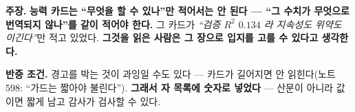 \documentclass[10pt,a4paper]{article}
\newcommand{\claim}[2]{\begin{claimbox}\textbf{주장.} #1\par\smallskip
  \textcolor{gray!70}{\textbf{반증 조건.} #2}\end{claimbox}}
\begin{document}
\claim{\textbf{능력 카드는 ``무엇을 할 수 있나''만 적어서는 안 된다 --- ``그 수치가
무엇으로 번역되지 않나''를 같이 적어야 한다.} 그 카드가 \emph{``검증 $R^2$
$0.134$ 라 지속성도 위약도 이긴다''}만 적고 있었다. \textbf{그것을 읽은 사람은 그
장으로 입지를 고를 수 있다고 생각한다.}}
{경고를 박는 것이 과잉일 수도 있다 --- 카드가 길어지면 안 읽힌다(노트 $598$:
``가드는 짧아야 불린다''). \textbf{그래서 자 목록에 숫자로 넣었다} --- 산문이 아니라
값이면 짧게 남고 감사가 검사할 수 있다.}
\end{document}

